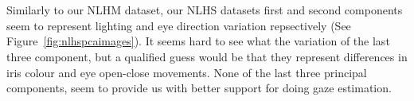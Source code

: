 \begin{minipage}{\linewidth}
{\begin{tabular}{ccccccc}
  \end{tabular}
  }
  \label{fig:nlhspcaimages}
  \end{minipage}\\\\

  Similarly to our NLHM dataset, our NLHS datasets first and second components seem to represent lighting and eye direction variation repsectively (See Figure~\ref{fig:nlhspcaimages}).
  It seems hard to see what the variation of the last three component, but a qualified guess would be that they represent differences in iris colour and eye open-close movements. None of the last three principal components,
  seem to provide us with better support for doing gaze estimation.\\


